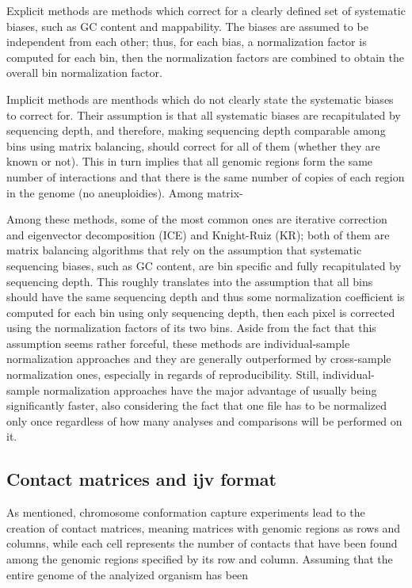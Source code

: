Explicit methods are methods which correct for a clearly defined set of systematic biases, such as GC content and mappability. The biases are assumed to be independent from each other; thus, for each bias, a normalization factor is computed for each bin, then the normalization factors are combined to obtain the overall bin normalization factor.

Implicit methods are menthods which do not clearly state the systematic biases to correct for. Their assumption is that all systematic biases are recapitulated by sequencing depth, and therefore, making sequencing depth comparable among bins using matrix balancing, should correct for all of them (whether they are known or not). This in turn implies that all genomic regions form the same number of interactions and that there is the same number of copies of each region in the genome (no aneuploidies). Among matrix-


Among these methods, some of the most common ones are iterative correction and eigenvector decomposition (ICE)\cite{ice2012} and Knight-Ruiz (KR)\cite{knightruiz2012}; both of them are matrix balancing algorithms that rely on the assumption that systematic sequencing biases, such as GC content, are bin specific and fully recapitulated by sequencing depth. This roughly translates into the assumption that all bins should have the same sequencing depth and thus some normalization coefficient is computed for each bin using only sequencing depth, then each pixel is corrected using the normalization factors of its two bins. Aside from the fact that this assumption seems rather forceful, these methods are individual-sample normalization approaches and they are generally outperformed by cross-sample normalization ones, especially in regards of reproducibility. Still, individual-sample normalization approaches have the major advantage of usually being significantly faster, also considering the fact that one file has to be normalized only once regardless of how many analyses and comparisons will be performed on it. 

\subsection{Contact matrices and ijv format}
As mentioned, chromosome conformation capture experiments lead to the creation of contact matrices, meaning matrices with genomic regions as rows and columns, while each cell represents the number of contacts that have been found among the genomic regions specified by its row and column. Assuming that the entire genome of the analyized organism has been 

